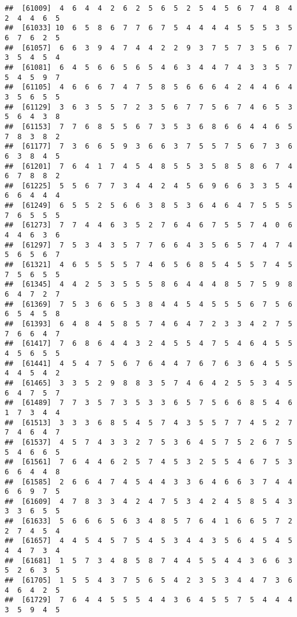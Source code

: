 \documentclass[
]{book}
\begin{document}
\begin{verbatim}
##  [61009]  4  6  4  4  2  6  2  5  6  5  2  5  4  5  6  7  4  8  4  2  4  4  6  5
##  [61033] 10  6  5  8  6  7  7  6  7  5  4  4  4  4  5  5  5  3  5  6  7  6  2  5
##  [61057]  6  6  3  9  4  7  4  4  2  2  9  3  7  5  7  3  5  6  7  3  5  4  5  4
##  [61081]  6  4  5  6  6  5  6  5  4  6  3  4  4  7  4  3  3  5  7  5  4  5  9  7
##  [61105]  4  6  6  6  7  4  7  5  8  5  6  6  6  4  2  4  4  6  4  3  5  6  5  5
##  [61129]  3  6  3  5  5  7  2  3  5  6  7  7  5  6  7  4  6  5  3  5  6  4  3  8
##  [61153]  7  7  6  8  5  5  6  7  3  5  3  6  8  6  6  4  4  6  5  7  8  3  8  2
##  [61177]  7  3  6  6  5  9  3  6  6  3  7  5  5  7  5  6  7  3  6  6  3  8  4  5
##  [61201]  7  6  4  1  7  4  5  4  8  5  5  3  5  8  5  8  6  7  4  6  7  8  8  2
##  [61225]  5  5  6  7  7  3  4  4  2  4  5  6  9  6  6  3  3  5  4  6  6  4  4  4
##  [61249]  6  5  5  2  5  6  6  3  8  5  3  6  4  6  4  7  5  5  5  7  6  5  5  5
##  [61273]  7  7  4  4  6  3  5  2  7  6  4  6  7  5  5  7  4  0  6  4  4  6  3  6
##  [61297]  7  5  3  4  3  5  7  7  6  6  4  3  5  6  5  7  4  7  4  5  6  5  6  7
##  [61321]  4  6  5  5  5  5  7  4  6  5  6  8  5  4  5  5  7  4  5  7  5  6  5  5
##  [61345]  4  4  2  5  3  5  5  5  8  6  4  4  4  8  5  7  5  9  8  6  4  7  2  7
##  [61369]  7  5  3  6  6  5  3  8  4  4  5  4  5  5  5  6  7  5  6  6  5  4  5  8
##  [61393]  6  4  8  4  5  8  5  7  4  6  4  7  2  3  3  4  2  7  5  7  6  6  4  7
##  [61417]  7  6  8  6  4  4  3  2  4  5  5  4  7  5  4  6  4  5  5  4  5  6  5  5
##  [61441]  4  5  4  7  5  6  7  6  4  4  7  6  7  6  3  6  4  5  5  4  4  5  4  2
##  [61465]  3  3  5  2  9  8  8  3  5  7  4  6  4  2  5  5  3  4  5  6  4  7  5  7
##  [61489]  7  7  3  5  7  3  5  3  3  6  5  7  5  6  6  8  5  4  6  1  7  3  4  4
##  [61513]  3  3  3  6  8  5  4  5  7  4  3  5  5  7  7  4  5  2  7  7  4  6  4  7
##  [61537]  4  5  7  4  3  3  2  7  5  3  6  4  5  7  5  2  6  7  5  5  4  6  6  5
##  [61561]  7  6  4  4  6  2  5  7  4  5  3  2  5  5  4  6  7  5  3  6  6  4  4  8
##  [61585]  2  6  6  4  7  4  5  4  4  3  3  6  4  6  6  3  7  4  4  6  6  9  7  5
##  [61609]  4  7  8  3  3  4  2  4  7  5  3  4  2  4  5  8  5  4  3  3  3  6  5  5
##  [61633]  5  6  6  6  5  6  3  4  8  5  7  6  4  1  6  6  5  7  2  2  7  4  5  4
##  [61657]  4  4  5  4  5  7  5  4  5  3  4  4  3  5  6  4  5  4  5  4  4  7  3  4
##  [61681]  1  5  7  3  4  8  5  8  7  4  4  5  5  4  4  3  6  6  3  5  2  6  3  5
##  [61705]  1  5  5  4  3  7  5  6  5  4  2  3  5  3  4  4  7  3  6  4  6  4  2  5
##  [61729]  7  6  4  4  5  5  5  4  4  3  6  4  5  5  7  5  4  4  4  3  5  9  4  5

\end{verbatim}
\end{document}
